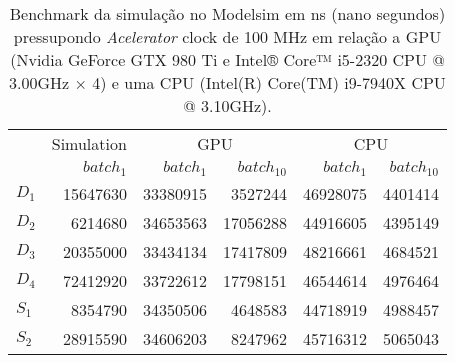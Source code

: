 \begin{table}[ht!]
\centering
\caption{Benchmark da simulação no Modelsim em ns (nano segundos) pressupondo \textit{Acelerator} clock de 100 MHz em relação a GPU (Nvidia GeForce GTX 980 Ti e Intel® Core™ i5-2320 CPU @ 3.00GHz × 4) e uma CPU (Intel(R) Core(TM) i9-7940X CPU @ 3.10GHz).}
\label{tab:5-dnn-benchmark}
\begin{tabular}{lrrrrr}
\toprule
 & Simulation & \multicolumn{2}{c}{GPU} & \multicolumn{2}{c}{CPU} \\
\cmidrule(lr){2-3} \cmidrule(l){4-5}
 & $batch_{1}$ & $batch_{1}$ & $batch_{10}$ & $batch_{1}$ & $batch_{10}$ \\
\midrule
$D_1$ & 15647630 & 33380915 & 3527244 & 46928075 & 4401414 \\
$D_2$ & 6214680 & 34653563 & 17056288 & 44916605 & 4395149 \\
$D_3$ & 20355000 & 33434134 & 17417809 & 48216661 & 4684521 \\
$D_4$ & 72412920 & 33722612 & 17798151 & 46544614 & 4976464 \\
$S_1$ & 8354790 & 34350506 & 4648583 & 44718919 & 4988457 \\
$S_2$ & 28915590 & 34606203 & 8247962 & 45716312 & 5065043 \\
\bottomrule
\end{tabular}
\end{table}
